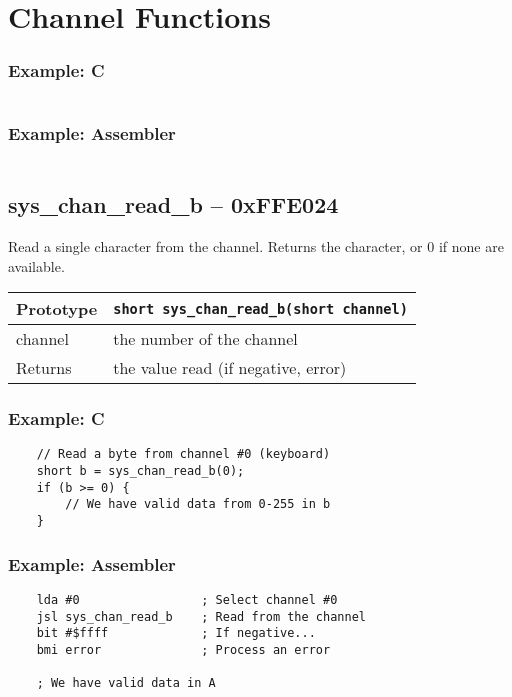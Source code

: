 \section{Channel Functions}

\subsubsection*{Example: C}
\begin{lstlisting}
\end{lstlisting}

\subsubsection*{Example: Assembler}
\begin{verbatim}
\end{verbatim}


\subsection*{sys\_chan\_read\_b -- 0xFFE024}
Read a single character from the channel. Returns the character, or 0 if none are available.


\bigskip

\begin{tabular}{|l||l|} \hline
Prototype & \lstinline!short sys_chan_read_b(short channel)! \\ \hline
channel & the number of the channel \\ \hline
Returns & the value read (if negative, error) \\ \hline
\end{tabular}

\subsubsection*{Example: C}
\begin{lstlisting}
    // Read a byte from channel #0 (keyboard)
    short b = sys_chan_read_b(0);
    if (b >= 0) {
        // We have valid data from 0-255 in b
    }
\end{lstlisting}

\subsubsection*{Example: Assembler}
\begin{verbatim}
    lda #0                 ; Select channel #0
    jsl sys_chan_read_b    ; Read from the channel
    bit #$ffff             ; If negative...
    bmi error              ; Process an error

    ; We have valid data in A
\end{verbatim}

